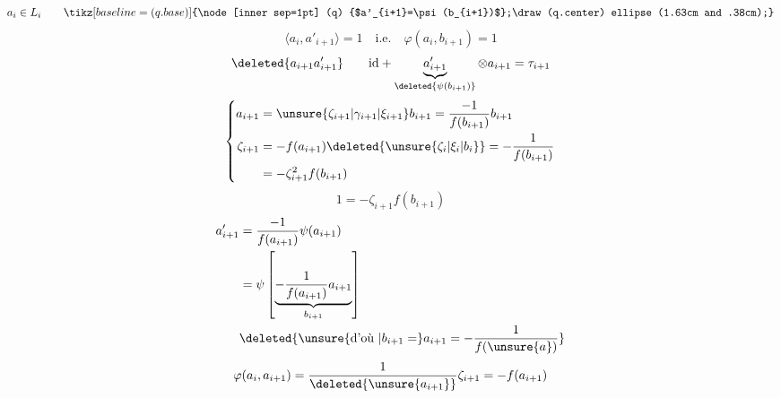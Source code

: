 \[
a_i\in L_i\qquad\mathord{\tikz[baseline=(q.base)]{\node[inner sep=1pt] (q) {$a'_{i+1}=\psi(b_{i+1})$};\draw (q.center) ellipse (1.63cm and .38cm);}}
\]
\[
\langle a_i,a'_{i+1}\rangle=1\quad\text{i.e.}\quad \boxed{\varphi(a_i,b_{i+1})=1}
\]
\[
\deleted{a_{i+1}a'_{i+1}}\qquad
\mathrm{id}+\underbrace{a'_{i+1}}_{\deleted{\psi(b_{i+1})}}\otimes a_{i+1}=\tau_{i+1}
\]
\[
\left\{\begin{aligned}
a_{i+1}&=\unsure{\zeta_{i+1}|\gamma_{i+1}|\xi_{i+1}}b_{i+1}=\frac{-1}{f(b_{i+1})}b_{i+1}\\
\zeta_{i+1}&=-f(a_{i+1})\deleted{\unsure{\zeta_i|\xi_i|b_i}}=-\frac1{f(b_{i+1})}\\
&=-\zeta_{i+1}^2 f(b_{i+1})
\end{aligned}\right.
\]
\[
1=-\zeta_{i+1}f(b_{i+1})
\]
\[
\begin{aligned}
a'_{i+1}&=\frac{-1}{f(a_{i+1})}\psi(a_{i+1})\\
&=\psi\left[\underbrace{-\frac1{f(a_{i+1})}a_{i+1}}_{b_{i+1}}\right]\\
&\deleted{\unsure{\text{d'où }|b_{i+1}=}a_{i+1}=-\frac1{f(\unsure{a})}}
\end{aligned}
\]
\[
\varphi(a_i,a_{i+1})=\frac{1}{\deleted{\unsure{a_{i+1}}}}\zeta_{i+1}=-f(a_{i+1})
\]
